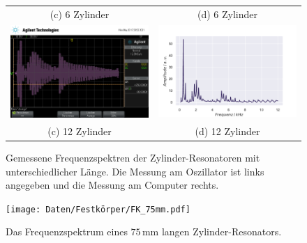 \begin{figure}
\begin{tabular}{cc}
    (c) 6 Zylinder & (d) 6 Zylinder \\[6pt]
    \includegraphics[width=65mm]{Daten/Zyinder/Zylinder_12.png} &   \includegraphics[width=65mm]{Daten/Zyinder/Zylinder_12.pdf} \\
    (c) 12 Zylinder & (d) 12 Zylinder \\[6pt]
    \end{tabular}
    \caption{Gemessene Frequenzspektren der Zylinder-Resonatoren mit unterschiedlicher Länge. Die Messung am Oszillator ist links angegeben und die Messung am Computer rechts. } 
    \label{fig:zyl1-6-12}
\end{figure}

\begin{figure}
    \centering
    \texttt{[image: Daten/Festkörper/FK\_75mm.pdf]}
    \caption{Das Frequenzspektrum eines $75 \,\si{\milli\metre}$ langen Zylinder-Resonators. }
    \label{fig:fkp75mm}
\end{figure}

